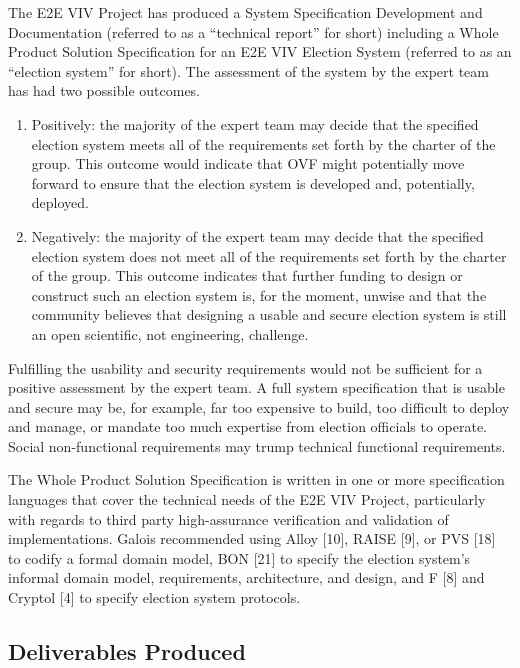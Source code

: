The E2E VIV Project has produced a System Specification Development
and Documentation (referred to as a ``technical report'' for short)
including a Whole Product Solution Specification for an E2E VIV
Election System (referred to as an ``election system'' for short). The
assessment of the system by the expert team has had two possible
outcomes.

\begin{enumerate}
\item Positively: the majority of the expert team may decide that the
  specified election system meets all of the requirements set forth by
  the charter of the group. This outcome would indicate that OVF might
  potentially move forward to ensure that the election system is
  developed and, potentially, deployed.
\item Negatively: the majority of the expert team may decide that the
  specified election system does not meet all of the requirements set
  forth by the charter of the group. This outcome indicates that
  further funding to design or construct such an election system is,
  for the moment, unwise and that the community believes that
  designing a usable and secure election system is still an open
  scientific, not engineering, challenge.
\end{enumerate}

Fulfilling the usability and security requirements would not be
sufficient for a positive assessment by the expert team. A full system
specification that is usable and secure may be, for example, far too
expensive to build, too difficult to deploy and manage, or mandate too
much expertise from election officials to operate. Social
non-functional requirements may trump technical functional
requirements.

The Whole Product Solution Specification is written in one or more
specification languages that cover the technical needs of the E2E VIV
Project, particularly with regards to third party high-assurance
verification and validation of implementations. Galois recommended
using Alloy [10], RAISE [9], or PVS [18] to codify a formal domain
model, BON [21] to specify the election system's informal domain
model, requirements, architecture, and design, and F [8] and Cryptol
[4] to specify election system protocols.


\subsection{Deliverables Produced}
\label{sec:deliv-prod}

